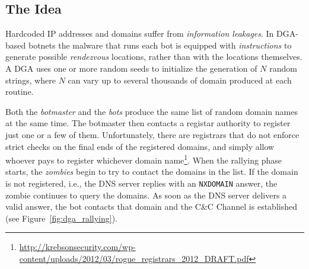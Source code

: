 \subsection{The Idea} %
\label{sub:the_idea}
Hardcoded IP addresses and domains  suffer
from \emph{information leakages}. In DGA-based botnets the malware that runs
each bot is equipped with \emph{instructions} to generate
possible \emph{rendezvous} locations, rather than with the locations themselves.
A DGA uses one
or more random seeds to initialize the generation of $N$ random strings, where
$N$ can vary up to several thousands of domain produced at each routine.

Both the \emph{botmaster} and the \emph{bots} produce the same list of random
domain names at the same time. The botmaster then contacts a registar
authority to register just one or a few of them.
Unfortunately, there are registrars that do not enforce strict checks on the final
ends of the registered domains, and simply allow whoever pays to register whichever
domain name\footnote{\url{http://krebsonsecurity.com/wp-content/uploads/2012/03/rogue_registrars_2012_DRAFT.pdf}}. When the rallying phase starts,
the \emph{zombies} begin to try to contact the domains in the list. If the
domain is not registered, i.e., the DNS server replies with an \texttt{NXDOMAIN}
answer, the zombie continues to query the domains. As soon as the DNS server
delivers a valid answer, the bot contacts that domain and the C\&C Channel is
established (see Figure~\ref{fig:dga_rallying}).

